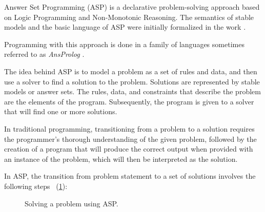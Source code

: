 \documentclass[10pt,leqno]{amsart}
\begin{document}
Answer Set Programming (ASP) \cite{Eiter2009} is a declarative problem-solving approach based on Logic Programming and Non-Monotonic Reasoning. The semantics of stable models and the basic language of ASP were initially formalized in the work \cite{Gelfond2000}.

Programming with this approach is done in a family of languages sometimes referred to as \textit{AnsProlog} \cite{Gelfond2002}.

The idea behind ASP is to model a problem as a set of rules and data, and then use a solver to find a solution to the problem. Solutions are represented by stable models or answer sets. The rules, data, and constraints that describe the problem are the elements of the program. Subsequently, the program is given to a solver that will find one or more solutions.

In traditional programming, transitioning from a problem to a solution requires the programmer's thorough understanding of the given problem, followed by the creation of a program that will produce the correct output when provided with an instance of the problem, which will then be interpreted as the solution.

In ASP, the transition from problem statement to a set of solutions involves the following steps \cite{Gebser2013}~(\cref{fig:asp-solving}):

\begin{figure}[htb]
    \begin{center}
    \end{center}
		\caption{Solving a problem using ASP.}
    \label{fig:asp-solving}
\end{figure}
\end{document}
